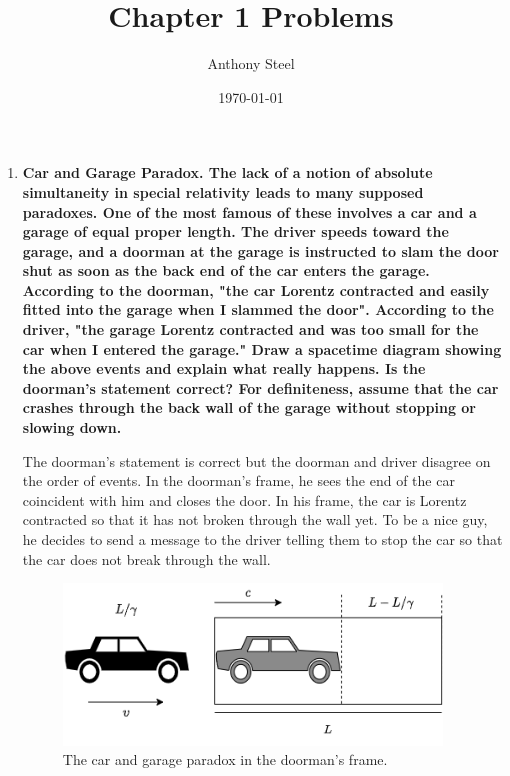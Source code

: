 \documentclass[9pt]{report}
\begin{document}
\title{Chapter 1 Problems}
\author{Anthony Steel}
\date{\today}
\maketitle
\begin{enumerate}
  \item \textbf{Car and Garage Paradox. The lack of a notion of absolute
      simultaneity in special relativity leads to many supposed paradoxes. One
      of the most famous of these involves a car and a garage of equal proper
      length. The driver speeds toward the garage, and a doorman at the garage
      is instructed to slam the door shut as soon as the back end of the car
      enters the garage. According to the doorman, "the car Lorentz contracted
      and easily fitted into the garage when I slammed the door". According to
      the driver, "the garage Lorentz contracted and was too small for the car
      when I entered the garage." Draw a spacetime diagram showing the above
      events and explain what really happens. Is the doorman's statement
      correct? For definiteness, assume that the car crashes through the
      back wall of the garage without stopping or slowing down.}

      The doorman's statement is correct but the doorman and
      driver disagree on the order of events. In the doorman's frame, he sees
      the end of the car coincident with him and closes the door. In his frame,
      the car is Lorentz contracted so that it has not broken through the wall yet.
      To be a nice guy, he decides to send a message to the driver telling them
      to stop the car so that the car does not break through the wall.

      \begin{figure}
        \includegraphics[width=0.95\textwidth]{images/carandgarageparadox.png}
        \caption{The car and garage paradox in the doorman's frame.}
        \label{doorman}
      \end{figure}


\end{enumerate}
\end{document}

